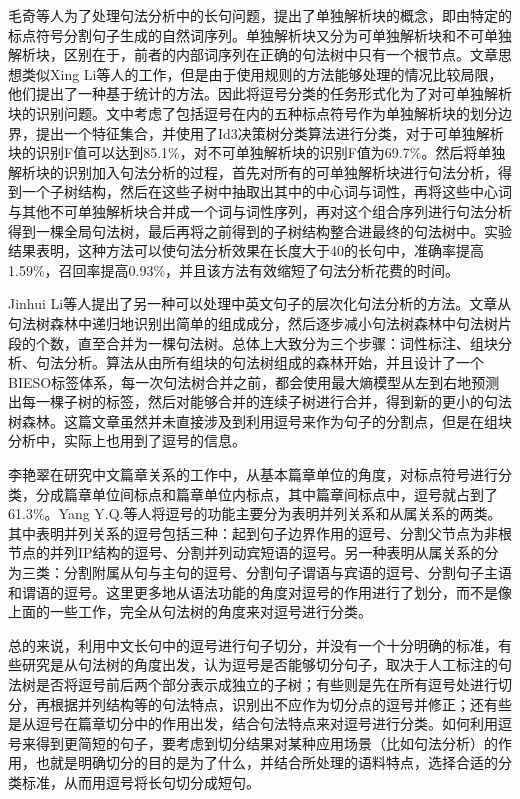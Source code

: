 \documentclass[master, winfont]{njuthesis}
\begin{document}
毛奇等人\cite{MQ}为了处理句法分析中的长句问题，提出了单独解析块的概念，即由特定的标点符号分割句子生成的自然词序列。单独解析块又分为可单独解析块和不可单独解析块，区别在于，前者的内部词序列在正确的句法树中只有一个根节点。文章思想类似Xing Li等人\cite{Li2004}的工作，但是由于使用规则的方法能够处理的情况比较局限，他们提出了一种基于统计的方法。因此将逗号分类的任务形式化为了对可单独解析块的识别问题。文中考虑了包括逗号在内的五种标点符号作为单独解析块的划分边界，提出一个特征集合，并使用了Id3决策树分类算法进行分类，对于可单独解析块的识别F值可以达到85.1\%，对不可单独解析块的识别F值为69.7\%。然后将单独解析块的识别加入句法分析的过程，首先对所有的可单独解析块进行句法分析，得到一个子树结构，然后在这些子树中抽取出其中的中心词与词性，再将这些中心词与其他不可单独解析块合并成一个词与词性序列，再对这个组合序列进行句法分析得到一棵全局句法树，最后再将之前得到的子树结构整合进最终的句法树中。实验结果表明，这种方法可以使句法分析效果在长度大于40的长句中，准确率提高1.59\%，召回率提高0.93\%，并且该方法有效缩短了句法分析花费的时间。

Jinhui Li等人\cite{Li2008}提出了另一种可以处理中英文句子的层次化句法分析的方法。文章从句法树森林中递归地识别出简单的组成成分，然后逐步减小句法树森林中句法树片段的个数，直至合并为一棵句法树。总体上大致分为三个步骤：词性标注、组块分析、句法分析。算法从由所有组块的句法树组成的森林开始，并且设计了一个BIESO标签体系，每一次句法树合并之前，都会使用最大熵模型从左到右地预测出每一棵子树的标签，然后对能够合并的连续子树进行合并，得到新的更小的句法树森林。这篇文章虽然并未直接涉及到利用逗号来作为句子的分割点，但是在组块分析中，实际上也用到了逗号的信息。

李艳翠\cite{liyancui2015}在研究中文篇章关系的工作中，从基本篇章单位的角度，对标点符号进行分类，分成篇章单位间标点和篇章单位内标点，其中篇章间标点中，逗号就占到了61.3\%。Yang Y.Q.等人\cite{Yang2012Chinese}将逗号的功能主要分为表明并列关系和从属关系的两类。其中表明并列关系的逗号包括三种：起到句子边界作用的逗号、分割父节点为非根节点的并列IP结构的逗号、分割并列动宾短语的逗号。另一种表明从属关系的分为三类：分割附属从句与主句的逗号、分割句子谓语与宾语的逗号、分割句子主语和谓语的逗号。这里更多地从语法功能的角度对逗号的作用进行了划分，而不是像上面的一些工作，完全从句法树的角度来对逗号进行分类。

总的来说，利用中文长句中的逗号进行句子切分，并没有一个十分明确的标准，有些研究是从句法树的角度出发，认为逗号是否能够切分句子，取决于人工标注的句法树是否将逗号前后两个部分表示成独立的子树；有些则是先在所有逗号处进行切分，再根据并列结构等的句法特点，识别出不应作为切分点的逗号并修正；还有些是从逗号在篇章切分中的作用出发，结合句法特点来对逗号进行分类。如何利用逗号来得到更简短的句子，要考虑到切分结果对某种应用场景（比如句法分析）的作用，也就是明确切分的目的是为了什么，并结合所处理的语料特点，选择合适的分类标准，从而用逗号将长句切分成短句。
\end{document}
